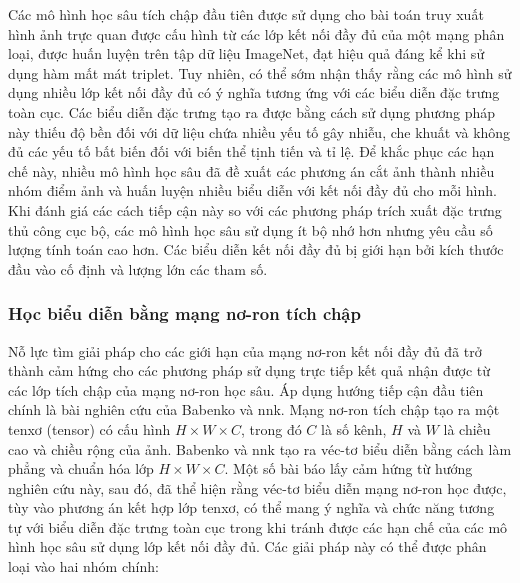 Các mô hình học sâu tích chập đầu tiên được sử dụng cho bài toán truy xuất hình ảnh trực quan được cấu hình từ các lớp kết nối đầy đủ\cite{razavian2014cnn, gong2014multiscale, babenko2014neural, deepindex, image-classification-retrieval, wang2014deep} của một mạng phân loại, được huấn luyện trên tập dữ liệu ImageNet\cite{russakovsky2015imagenet}, đạt hiệu quả đáng kể khi sử dụng hàm mất mát triplet\cite{wang2014deep, gomezojeda2015training}. Tuy nhiên, có thể sớm nhận thấy rằng các mô hình sử dụng nhiều lớp kết nối đầy đủ có ý nghĩa tương ứng với các biểu diễn đặc trưng toàn cục. Các biểu diễn đặc trưng tạo ra được bằng cách sử dụng phương pháp này thiếu độ bền đối với dữ liệu chứa nhiều yếu tố gây nhiễu, che khuất và không đủ các yếu tố bất biến đối với biến thể tịnh tiến và tỉ lệ. Để khắc phục các hạn chế này, nhiều mô hình học sâu đã đề xuất các phương án cắt ảnh thành nhiều nhóm điểm ảnh và huấn luyện nhiều biểu diễn với kết nối đầy đủ cho mỗi hình\cite{razavian2014cnn, babenko2014neural}. Khi đánh giá các cách tiếp cận này so với các phương pháp trích xuất đặc trưng thủ công cục bộ, các mô hình học sâu sử dụng ít bộ nhớ hơn nhưng yêu cầu số lượng tính toán cao hơn. Các biểu diễn kết nối đầy đủ bị giới hạn bởi kích thước đầu vào cố định và lượng lớn các tham số.

\subsubsection{Học biểu diễn bằng mạng nơ-ron tích chập}

Nỗ lực tìm giải pháp cho các giới hạn của mạng nơ-ron kết nối đầy đủ đã trở thành cảm hứng cho các phương pháp sử dụng trực tiếp kết quả nhận được từ các lớp tích chập của mạng nơ-ron học sâu. Áp dụng hướng tiếp cận đầu tiên chính là bài nghiên cứu của Babenko và nnk\cite{babenko2014neural}. Mạng nơ-ron tích chập tạo ra một tenxơ (tensor) có cấu hình \(H \times W \times C\), trong đó \(C\) là số kênh, \(H\) và \(W\) là chiều cao và chiều rộng của ảnh. Babenko và nnk tạo ra véc-tơ biểu diễn bằng cách làm phẳng và chuẩn hóa lớp \(H \times W \times C\). Một số bài báo lấy cảm hứng từ hướng nghiên cứu này\cite{hou2015convolutional}, sau đó, đã thể hiện rằng véc-tơ biểu diễn mạng nơ-ron học được, tùy vào phương án kết hợp lớp tenxơ, có thể mang ý nghĩa và chức năng tương tự với biểu diễn đặc trưng toàn cục trong khi tránh được các hạn chế của các mô hình học sâu sử dụng lớp kết nối đầy đủ. Các giải pháp này có thể được phân loại vào hai nhóm chính\cite{Masone2021ASO}:

